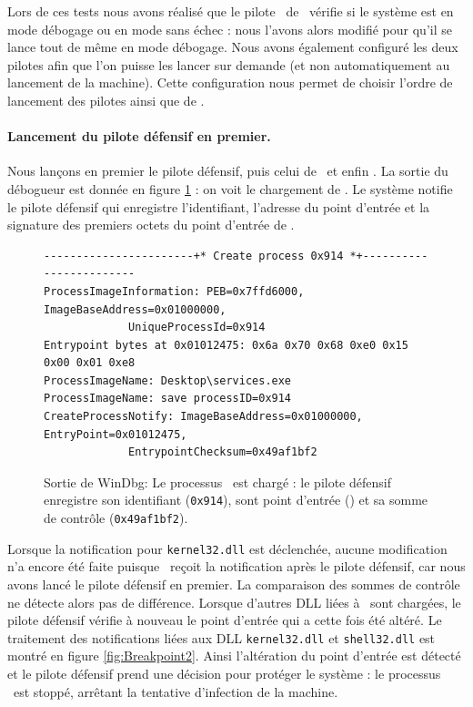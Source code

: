 Lors de ces tests nous avons réalisé que le pilote \driver\ de \duqu\ vérifie si le système est en mode débogage ou en mode sans échec : nous l'avons alors modifié pour qu'il se lance tout de même en mode débogage.
Nous avons également configuré les deux pilotes afin que l'on puisse les lancer sur demande (et non automatiquement au lancement de la machine).
Cette configuration nous permet de choisir l'ordre de lancement des pilotes ainsi que de \services.

\paragraph{Lancement du pilote défensif en premier.}
Nous lançons en premier le pilote défensif, puis celui de \duqu\ et enfin \services.
La sortie du débogueur est donnée en figure \ref{fig:Breakpoint1} : on voit le chargement de \services.
Le système notifie le pilote défensif qui enregistre l'identifiant, l'adresse du point d'entrée et la signature des premiers octets du point d'entrée de \services.

\begin{figure}[h]
\begin{center}
\scriptsize
\begin{lstlisting}[language={}]
-----------------------+* Create process 0x914 *+------------------------
ProcessImageInformation: PEB=0x7ffd6000, ImageBaseAddress=0x01000000,
			 UniqueProcessId=0x914 
Entrypoint bytes at 0x01012475: 0x6a 0x70 0x68 0xe0 0x15 0x00 0x01 0xe8
ProcessImageName: Desktop\services.exe
ProcessImageName: save processID=0x914
CreateProcessNotify: ImageBaseAddress=0x01000000, EntryPoint=0x01012475,
		     EntrypointChecksum=0x49af1bf2
\end{lstlisting}
\end{center}
\caption{Sortie de WinDbg: Le processus \services\ est chargé : le pilote défensif enregistre son identifiant (\texttt{0x914}), sont point d'entrée () et sa somme de contrôle (\texttt{0x49af1bf2}).\label{fig:Breakpoint1}}
\end{figure}

Lorsque la notification pour \texttt{kernel32.dll} est déclenchée, aucune modification n'a encore été faite puisque \duqu\ reçoit la notification après le pilote défensif, car nous avons lancé le pilote défensif en premier.
La comparaison des sommes de contrôle ne détecte alors pas de différence.
Lorsque d'autres DLL liées à \services\ sont chargées, le pilote défensif vérifie à nouveau le point d'entrée qui a cette fois été altéré.
Le traitement des notifications liées aux DLL \texttt{kernel32.dll} et \texttt{shell32.dll} est montré en figure \ref{fig:Breakpoint2}.
Ainsi l'altération du point d'entrée est détecté et le pilote défensif prend une décision pour protéger le système : le processus \services\ est stoppé, arrêtant la tentative d'infection de la machine.


